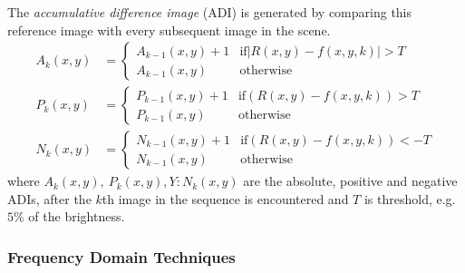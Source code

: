 The \emph{accumulative difference image} (ADI) is generated by comparing this reference image with every subsequent image in the scene. 
\begin{align*}
	A_k(x,y) &= 
		\begin{cases}
			A_{k-1}(x,y) + 1 & \text{if} \left|R(x,y) - f(x,y,k)\right| > T \\
			A_{k-1}(x,y) & \text{otherwise}
		\end{cases} \\
	P_k(x,y) &= 
		\begin{cases}
			P_{k-1}(x,y) + 1 & \text{if} \left(R(x,y) - f(x,y,k)\right) > T \\
			P_{k-1}(x,y) & \text{otherwise}
		\end{cases} \\
	N_k(x,y) &= 
		\begin{cases}
			N_{k-1}(x,y) + 1 & \text{if} \left(R(x,y) - f(x,y,k)\right) < -T \\
			N_{k-1}(x,y) & \text{otherwise}
		\end{cases}
\end{align*}
where $A_k(x,y), \: P_k(x,y), Y: N_k(x,y)$ are the absolute, positive and negative ADIs, after the $k$th image in the sequence is encountered and $T$ is threshold, e.g. $5\%$ of the brightness.

\subsubsection{Frequency Domain Techniques}
